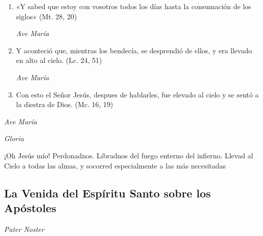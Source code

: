 \documentclass[a4paper,11pt, oneside]{report}
\begin{document}
\begin{enumerate}
          \item «Y sabed que estoy con vosotros todos los días hasta la consumación de los siglos» (Mt. 28, 20)

          \textit{Ave María}

          \item Y aconteció que, mientras los bendecía, se desprendió de ellos, y era llevado en alto al cielo. (Lc. 24, 51)

          \textit{Ave María}

          \item Con esto el Señor Jesús, despues de hablarles, fue elevado al cielo y se sentó a la diestra de Dios. (Mc. 16, 19)

        \end{enumerate}

        \textit{Ave María} \par
        \indent\textit{Gloria} \par
        \indent¡Oh Jesús mío! Perdonadnos. Libradnos del fuego enterno del infierno. Llevad al Cielo a todas las almas, y socorred especialmente a las más 
        necesitadas

      \subsection*{La Venida del Espíritu Santo sobre los Apóstoles}

        \textit{Pater Noster}
\end{document}
